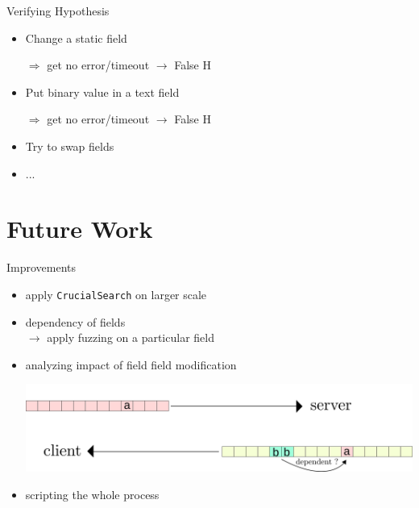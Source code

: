 \documentclass{beamer}
\newcounter{m} %
\newcounter{c} %
\begin{document}
  \begin{frame}{Verifying Hypothesis}
  \begin{itemize}
  \item Change a static field

  $\Rightarrow$ get no error/timeout $\rightarrow$ False H
  
  \bigskip

  \item Put binary value in a text field
  
  $\Rightarrow$ get no error/timeout $\rightarrow$ False H
  
  
\bigskip

  \item Try to swap fields
  
\bigskip

	\item ...  
  \end{itemize}
  \end{frame}


\section{Future Work}
\begin{frame}

	\tableofcontents[currentsection]
\end{frame}

\begin{frame}{Improvements}

\begin{itemize}
    \item apply \texttt{CrucialSearch} on larger scale
    \item dependency of fields\\
    \quad\quad $\rightarrow$ apply fuzzing on a particular field
    \item analyzing impact of field field modification\\
    \begin{center}\includegraphics[scale=0.5]{relations.png}\end{center}
    \item scripting the whole process
\end{itemize}
\end{frame}
\end{document}
